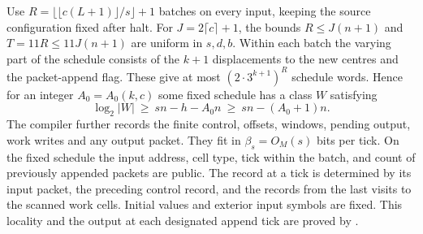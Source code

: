 Use $R=\lfloor\lfloor c(L+1)\rfloor/s\rfloor+1$ batches on every input,
keeping the source configuration fixed after halt. For
$J=2\lceil c\rceil+1$, the bounds $R\le J(n+1)$ and $T=11R\le11J(n+1)$
are uniform in $s,d,b$. Within each batch the varying part of the
schedule consists of the $k+1$ displacements to the new centres and the
packet-append flag. These give at most $(2\cdot3^{k+1})^R$ schedule
words. Hence for an integer $A_0=A_0(k,c)$ some fixed schedule has a
class $W$ satisfying
\[
  \log_2|W|\ \ge\ sn-h-A_0 n\ \ge\ sn-(A_0+1)n.
\]
The compiler further records the finite control, offsets, windows,
pending output, work writes and any output packet. They fit in
$\beta_s=O_M(s)$ bits per tick. On the fixed schedule the input address,
cell type, tick within the batch, and count of previously appended
packets are public. The record at a tick is determined by its input
packet, the preceding control record, and the records from the last
visits to the scanned work cells. Initial values and exterior input
symbols are fixed. This locality and the output at each designated
append tick are proved by .
